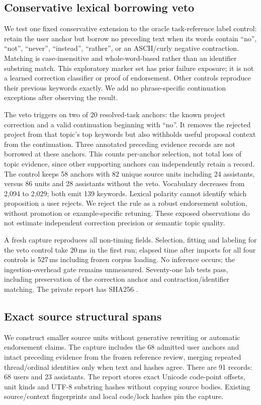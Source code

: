 \documentclass[11pt]{article}
\begin{document}
\subsection{Conservative lexical borrowing veto}
We test one fixed conservative extension to the oracle task-reference label
control: retain the user anchor but borrow no preceding text when its words
contain ``no'', ``not'', ``never'', ``instead'', ``rather'', or an ASCII/curly
negative contraction. Matching is case-insensitive and whole-word-based rather
than an identifier substring match. This exploratory marker set has prior failure
exposure; it is not a learned correction classifier or proof of endorsement.
Other controls reproduce their previous keywords exactly. We add no
phrase-specific continuation exceptions after observing the result.

The veto triggers on two of 20 resolved-task anchors: the known project correction
and a valid continuation beginning with ``no''. It removes the rejected project
from that topic's top keywords but also withholds useful proposal context from
the continuation. Three annotated preceding evidence records are not borrowed
at these anchors. This counts per-anchor selection, not total loss of topic
evidence, since other supporting anchors can independently retain a record.
The control keeps 58 anchors with 82 unique source units including 24 assistants,
versus 86 units and 28 assistants without the veto. Vocabulary decreases from
2,094 to 2,029; both emit 139 keywords. Lexical polarity cannot identify which
proposition a user rejects. We reject the rule as a robust endorsement solution,
without promotion or example-specific retuning. These exposed observations do
not estimate independent correction precision or semantic topic quality.

A fresh capture reproduces all non-timing fields. Selection, fitting and labeling
for the veto control take 20\,ms in the first run; elapsed time after imports for
all four controls is 527\,ms including frozen corpus loading. No inference occurs;
the ingestion-overhead gate remains unmeasured. Seventy-one lab tests pass,
including preservation of the correction anchor and contraction/identifier
matching. The private report  has SHA256
.

\subsection{Exact source structural spans}
We construct smaller source units without generative rewriting or automatic
endorsement claims. The capture includes the 68 admitted user anchors and intact
preceding evidence from the frozen reference review, merging repeated
thread/ordinal identities only when text and hashes agree. There are 91 records:
68 users and 23 assistants. The report stores exact Unicode code-point offsets,
unit kinds and UTF-8 substring hashes without copying source bodies. Existing
source/context fingerprints and local code/lock hashes pin the capture.
\end{document}
